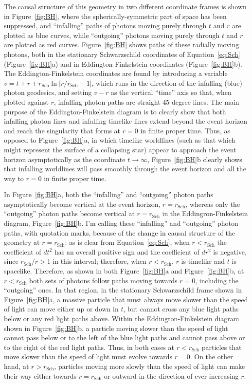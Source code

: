 \documentclass[aps,rmp,groupedaddress,twocolumn,10pt]{revtex4-2}
\begin{document}
The causal structure of this geometry in two different coordinate frames is shown in Figure~\ref{fig:BH}, where the spherically-symmetric part of space has been suppressed, and ``infalling'' paths of photons moving purely through $t$ and $r$ are plotted as blue curves, while ``outgoing'' photons moving purely through $t$ and $r$ are plotted as red curves. Figure~\ref{fig:BH} shows paths of these radially moving photons, both in the stationary Schwarzschild coordinates of Equation~\ref{eq:Sch} (Figure~\ref{fig:BH}a) and in Eddington-Finkelstein coordinates (Figure~\ref{fig:BH}b). The Eddington-Finkelstein coordinates are found by introducing a variable $v=t+r+r_{\mathrm{Sch}}\ln|r/r_{\mathrm{Sch}}-1|$, which runs in the direction of the infalling (blue) photon geodesics, and setting $v-r$ as the vertical ``time'' axis so that, when plotted against $r$, infalling photon paths are straight 45-degree lines. The main purpose of the Eddington-Finkelstein diagram is to clearly show that both infalling photon lines and infalling timelike lines extend beyond the event horizon and reach the singularity that forms at $r=0$ in finite proper time. Thus, as opposed to Figure~\ref{fig:BH}a, in which timelike worldlines (such as that which might represent the surface of a collapsing star) appear to approach the event horizon asymptotically as the coordinate $t\rightarrow\infty$, Figure~\ref{fig:BH}b clearly shows that infalling worldlines will pass smoothly through the event horizon and all the way to $r=0$ in finite proper time.

In Figure~\ref{fig:BH}a, both the ``infalling'' and ``outgoing'' photon paths asymptotically become vertical at the event horizon, $r=r_{\mathrm{Sch}}$, whereas only the ``outgoing'' photon paths become vertical at $r=r_{\mathrm{Sch}}$ in the Eddingron-Finkelstein diagram, Figure~\ref{fig:BH}b. I'm calling these ``infalling'' and ``outgoing'' photon paths, with quotation marks, because of the change in causal structure of the geometry at $r=r_{\mathrm{Sch}}$: as is clear from Equation~\ref{eq:Sch}, when $r<r_{\mathrm{Sch}}$ the coefficient of $dt^2$ has an overall positive sign and the coefficient of $dr^2$ is negative, since $r_{\mathrm{Sch}}/r>1$ in this interval; therefore, when $r<r_{\mathrm{Sch}}$, $r$ is timelike and $t$ is spacelike. Therefore, as shown in both Figure~\ref{fig:BH}a and Figure~\ref{fig:BH}b, at $r<r_{\mathrm{Sch}}$ both sets of photons follow paths moving towards $r=0$, including the ``outgoing'' ones. In that region, in the stationary Schwarzschild frame shown in Figure~\ref{fig:BH}a, a massive particle that must always move slower than the speed of light can move either up or down in $t$, but cannot cross any blue light paths below or any red light paths above. Within the Eddington-Finkelstein diagram shown in Figure~\ref{fig:BH}b, a particle moving slower than the speed of light cannot pass below or to the left of the blue light paths and cannot pass above or to the right of the red light paths. Thus, in both cases at $r<r_{\mathrm{Sch}}$ particles that move slower than the speed of light must evolve towards $r=0$. On the other hand, at $r>r_{\mathrm{Sch}}$, particles moving more slowly than the speed of light can make their way either towards $r=r_{\mathrm{Sch}}$ or outward in the direction of ever increasing $r$.
\end{document}
